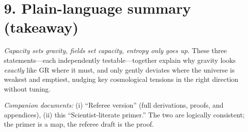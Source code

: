 \documentclass[aps,prd,onecolumn,superscriptaddress,nofootinbib]{revtex4-2}
\begin{document}
\section*{9. Plain-language summary (takeaway)}
\emph{Capacity sets gravity, fields set capacity, entropy only goes up.} These three statements—each independently testable—together explain why gravity looks \emph{exactly} like GR where it must, and only gently deviates where the universe is weakest and emptiest, nudging key cosmological tensions in the right direction without tuning.

\bigskip
\noindent\textit{Companion documents:} (i) “Referee version” (full derivations, proofs, and appendices), (ii) this “Scientist-literate primer.” The two are logically consistent; the primer is a map, the referee draft is the proof.
\end{document}
